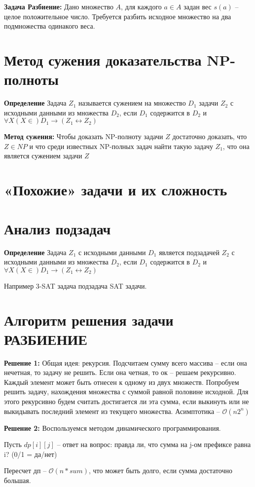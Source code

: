 \documentclass[40pt]{article}
\begin{document}
 
    \par \textbf{Задача Разбиение:} Дано множество $A$, для каждого $a \in A$ задан вес $s(a)$ -- целое положительное число.
    Требуется разбить исходное множество на два подмножества одинакого веса.
    
    
\section{Метод сужения доказательства NP-полноты}

\par \textbf{Определение} Задача $Z_1$ называется сужением на множество $D_1$ задачи $Z_2$ с исходными данными из множества $D_2$, если $D_1$ содержится в $D_2$ и $\forall X(X\in) D_1 \rightarrow (Z_1 \leftrightarrow Z_2)$ 
 
	\par \textbf{Метод сужения:} Чтобы доказать NP-полноту задачи $Z$ достаточно доказать, что $Z \in NP$ и что среди известных NP-полных задач найти такую задачу $Z_1$, что она является сужением задачи $Z$
	
\section{«Похожие» задачи и их сложность}
\section{Анализ подзадач}

\par \textbf{Определение} Задача $Z_1$ с исходными данными $D_1$ является подзадачей $Z_2$ с исходными данными из множества $D_2$, если $D_1$ содержится в $D_2$ и $\forall X(X\in) D_1 \rightarrow (Z_1 \leftrightarrow Z_2)$ 
 
     \par Например 3-SAT задача подзадача SAT задачи.
     
\section{Алгоритм решения задачи РАЗБИЕНИЕ}

\par \textbf{Решение 1:} Общая идея: рекурсия. Подсчитаем сумму всего массива -- если она нечетная, то задачу не решить. Если она четная, то ок -- решаем рекурсивно. Каждый элемент может быть отнесен к одному из двух множеств. Попробуем решить задачу, нахождения множества с суммой равной половине исходной. Для этого рекурсивно будем считать достигается ли эта сумма, если выкинуть или не выкидывать последний элемент из текущего множества. Асимптотика -- $\mathcal O(n2^n)$
    \par \textbf{Решение 2:} Воспользуемся методом динамического программирования. 
    \par Пусть $dp[i][j]$ -- ответ на вопрос: правда ли, что сумма на j-ом префиксе равна i? (0/1 = да/нет)
    \par Пересчет дп -- $\mathcal O(n*sum )$, что может быть долго, если сумма достаточно большая.
\end{document}
